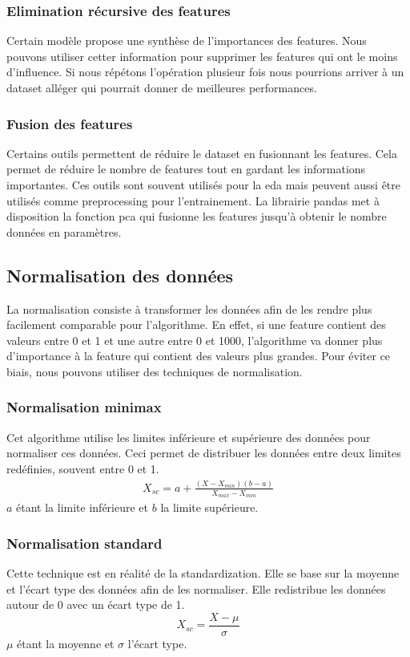 \subsubsection{Elimination récursive des features}
Certain modèle propose une synthèse de l'importances des features.
Nous pouvons utiliser cetter information pour supprimer les features qui ont le moins d'influence.
Si nous répétons l'opération plusieur fois nous pourrions arriver à un dataset alléger qui pourrait donner de meilleures performances.

\subsubsection{Fusion des features}
Certains outils permettent de réduire le dataset en fusionnant les features.
Cela permet de réduire le nombre de features tout en gardant les informations importantes.
Ces outils sont souvent utilisés pour la \acrfull{eda} mais peuvent aussi être utilisés comme preprocessing pour l'entrainement.
La librairie \acrshort{pandas} met à disposition la fonction \acrshort{pca} qui fusionne les features jusqu'à obtenir le nombre données en paramètres.


\subsection{Normalisation des données}
La normalisation consiste à transformer les données afin de les rendre plus facilement comparable pour l'algorithme.
En effet, si une feature contient des valeurs entre 0 et 1 et une autre entre 0 et 1000, l'algorithme va donner plus d'importance à la feature qui contient des valeurs plus grandes.
Pour éviter ce biais, nous pouvons utiliser des techniques de normalisation.

\subsubsection{Normalisation \acrshort{minimax}}
\label{analyse:ml:normalisation:minimax}
Cet algorithme utilise les limites inférieure et supérieure des données pour normaliser ces données.
Ceci permet de distribuer les données entre deux limites redéfinies, souvent entre 0 et 1.
\begin{align*}
    X_{sc} = a + \frac{(X - X_{min})(b - a)}{X_{max} - X_{min}}
\end{align*}
$a$ étant la limite inférieure et $b$ la limite supérieure.

\subsubsection{Normalisation standard}
\label{analyse:ml:normalisation:standard}
Cette technique est en réalité de la standardization.
Elle se base sur la moyenne et l'écart type des données afin de les normaliser.
Elle redistribue les données autour de 0 avec un écart type de 1.
\begin{equation*}
    X_{sc} = \frac{X - \mu}{\sigma}
\end{equation*}
$\mu$ étant la moyenne et $\sigma$ l'écart type.


